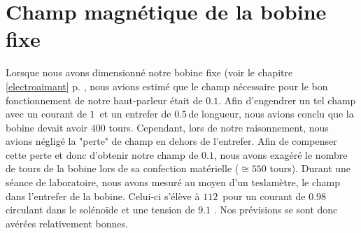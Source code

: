 \section{Champ magnétique de la bobine fixe}
\label{mesures champ}
Lorsque nous avons dimensionné notre bobine fixe (voir le chapitre \ref{electroaimant} p. \pageref{electroaimant}, nous avions estimé que le champ nécessaire pour le bon fonctionnement de notre haut-parleur était de $0.1$\tesla.  Afin d'engendrer un tel champ avec un courant de $1$\ampere \, et un entrefer de $0.5$\centi\meter \,de longueur, nous avions conclu que la bobine devait avoir $400$ tours. Cependant, lors de notre raisonnement, nous avions négligé la "perte" de champ en dehors de l'entrefer. Afin de compenser cette perte et donc d'obtenir notre champ de $0.1$\tesla, nous avons exagéré le nombre de tours de la bobine lors de sa confection matérielle ($\cong 550$ tours). 
Durant une séance de laboratoire, nous avons mesuré au moyen d'un teslamètre, le champ dans l'entrefer de la bobine. Celui-ci s'élève à $112$\milli \tesla \, pour un courant de $0.98$ \ampere \,circulant dans le solénoïde et une tension de $9.1$ \volt. Nos prévisions se sont donc avérées relativement bonnes.